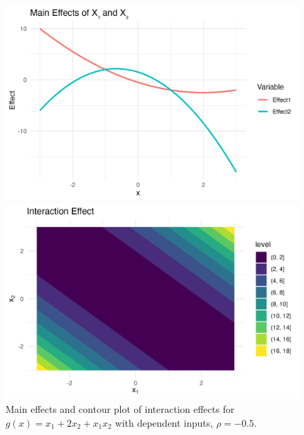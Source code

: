 \begin{figure}[htpb]
    \centering
    \begin{minipage}[t]{0.49\textwidth}
        \centering
        \includegraphics[width=\textwidth]{images/full_a1m20_a2m20_a11p10_a22m10_a12p10_rhom10_main.png}
    \end{minipage}%
    \hfill
    \begin{minipage}[t]{0.49\textwidth}
        \centering
        \includegraphics[width=\textwidth]{images/full_a1m20_a2m20_a11p10_a22m10_a12p10_rhom10_interaction.png}
        \caption{Main effects and contour plot of interaction effects for $g(x) = x_1 + 2 x_2 + x_1 x_2$ with dependent inputs, $\rho = -0.5$.}
        \label{fig:full_rho_neg1}
    \end{minipage}
\end{figure}


